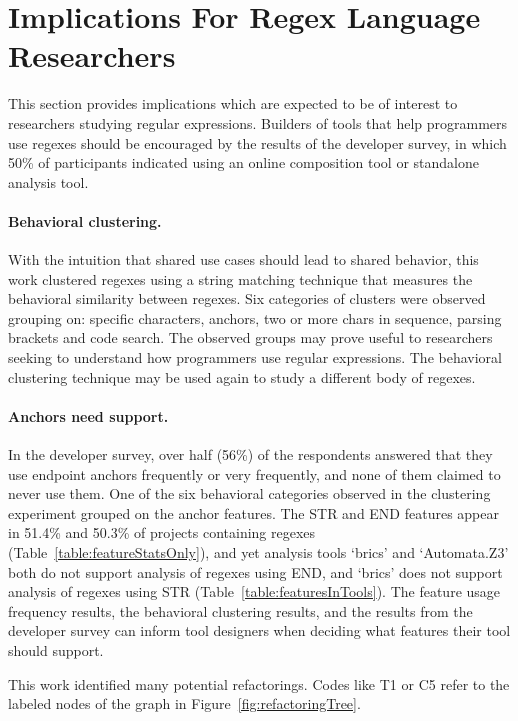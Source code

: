 \section{Implications For Regex Language Researchers}
This section provides implications which are expected to be of interest to researchers studying regular expressions.  Builders of tools that help programmers use regexes should be encouraged by the results of the developer survey, in which 50\% of participants indicated using an online composition tool or standalone analysis tool.

\paragraph{Behavioral clustering.}  With the intuition that shared use cases should lead to shared behavior, this work clustered regexes using a string matching technique that measures the behavioral similarity between regexes.  Six categories of clusters were observed grouping on: specific characters, anchors, two or more chars in sequence, parsing brackets and code search.  The observed groups may prove useful to researchers seeking to understand how programmers use regular expressions.  The behavioral clustering technique may be used again to study a different body of regexes.

\paragraph{Anchors need support.}  In the developer survey, over half (56\%) of the respondents answered that they use endpoint anchors frequently or very frequently, and none of them claimed to never use them.  One of the six behavioral categories observed in the clustering experiment grouped on the anchor features.  The STR and END features appear in 51.4\% and 50.3\% of projects containing regexes (Table~\ref{table:featureStatsOnly}), and yet analysis tools `brics' and `Automata.Z3' both do not support analysis of regexes using END, and `brics' does not support analysis of regexes using STR (Table~\ref{table:featuresInTools}).  The feature usage frequency results, the behavioral clustering results, and the results from the developer survey can inform tool designers when deciding what features their tool should support.

This work identified many potential refactorings.  Codes like T1 or C5 refer to the labeled nodes of the graph in Figure~\ref{fig:refactoringTree}.

